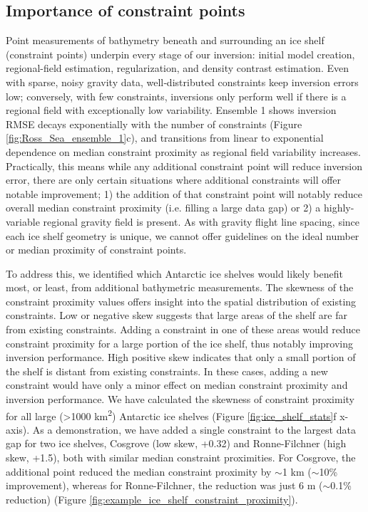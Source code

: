 \documentclass[tc, manuscript]{copernicus}
\begin{document}
\subsection{Importance of constraint points}
Point measurements of bathymetry beneath and surrounding an ice shelf (constraint points) underpin every stage of our inversion: initial model creation, regional-field estimation, regularization, and density contrast estimation. Even with sparse, noisy gravity data, well‐distributed constraints keep inversion errors low; conversely, with few constraints, inversions only perform well if there is a regional field with exceptionally low variability. Ensemble 1 shows inversion RMSE decays exponentially with the number of constraints (Figure \ref{fig:Ross_Sea_ensemble_1}c), and transitions from linear to exponential dependence on median constraint proximity as regional field variability increases. Practically, this means while any additional constraint point will reduce inversion error, there are only certain situations where additional constraints will offer notable improvement; 1) the addition of that constraint point will notably reduce overall median constraint proximity (i.e. filling a large data gap) or 2) a highly-variable regional gravity field is present. As with gravity flight line spacing, since each ice shelf geometry is unique, we cannot offer guidelines on the ideal number or median proximity of constraint points.

To address this, we identified which Antarctic ice shelves would likely benefit most, or least, from additional bathymetric measurements. The skewness of the constraint proximity values offers insight into the spatial distribution of existing constraints. Low or negative skew suggests that large areas of the shelf are far from existing constraints. Adding a constraint in one of these areas would reduce constraint proximity for a large portion of the ice shelf, thus notably improving inversion performance. High positive skew indicates that only a small portion of the shelf is distant from existing constraints. In these cases, adding a new constraint would have only a minor effect on median constraint proximity and inversion performance. We have calculated the skewness of constraint proximity for all large (\textgreater 1000 km\textsuperscript{2}) Antarctic ice shelves (Figure \ref{fig:ice_shelf_stats}f x-axis). As a demonstration, we have added a single constraint to the largest data gap for two ice shelves, Cosgrove (low skew, +0.32) and Ronne-Filchner (high skew, +1.5), both with similar median constraint proximities. For Cosgrove, the additional point reduced the median constraint proximity by $\sim$1 km ($\sim$10\% improvement), whereas for Ronne-Filchner, the reduction was just 6 m ($\sim$0.1\% reduction) (Figure \ref{fig:example_ice_shelf_constraint_proximity}).
\end{document}
